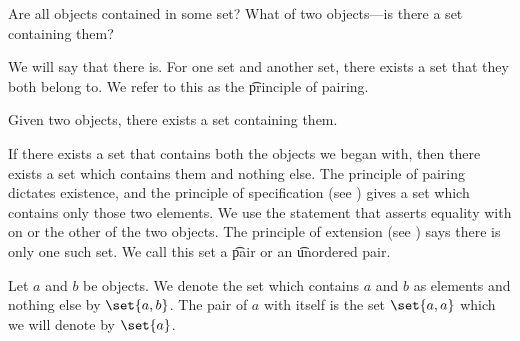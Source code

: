 

Are all objects contained in some set?
What of two objects---is there a set containing them?


We will say that there is.
For one set and another set, there exists a set that they both belong to.
We refer to this as the \t{principle of pairing}.

\begin{principle}[Pairing]
	Given two objects, there exists a set containing them.
\end{principle}

If there exists a set that contains both the objects we began with, then there exists a set which contains them and nothing else.
The principle of pairing dictates existence, and the principle of specification (see ) gives a set which contains only those two elements.
We use the statement that asserts equality with on or the other of the two objects.
The principle of extension (see ) says there is only one such set.
We call this set a \t{pair} or an \t{unordered pair}.


Let $a$ and $b$ be objects.
We denote the set which contains $a$ and $b$ as elements and nothing else by $\set{a, b}$.
The pair of $a$ with itself is the set $\set{a, a}$ which we will denote by $\set{a}$.

\blankpage
